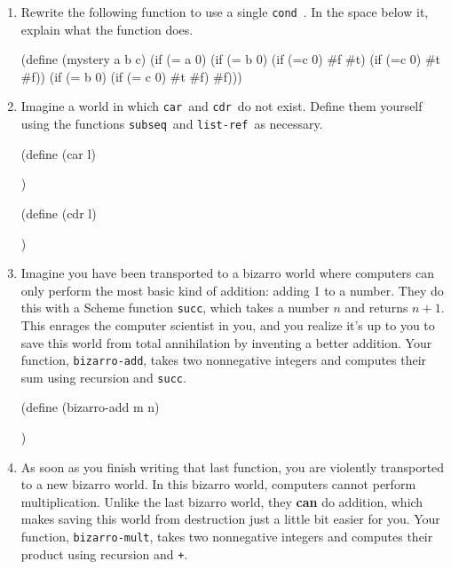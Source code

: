 \documentclass[pdftex,11pt]{article}
\newcommand{\cond}{{\tt cond}\ }
\newcommand{\car}{{\tt car}\ }
\newcommand{\cdr}{{\tt cdr}\ }
\newcommand{\lref}{{\tt list-ref}\ }
\newcommand{\subseq}{{\tt subseq}\ }
\begin{document}
\begin{enumerate}
\item Rewrite the following function to use a single \cond. In the
  space below it, explain what the function does.

\begin{answer}
(define (mystery a b c)
  (if (= a 0)
      (if (= b 0)
          (if (=c 0) #f #t)
          (if (=c 0) #t #f))
      (if (= b 0)
          (if (= c 0) #t #f)
          #f)))
\end{answer}

\vspace{1in}

\item Imagine a world in which \car and \cdr do not exist. Define them
  yourself using the functions \subseq and \lref as necessary.

\begin{minipage}{.47\textwidth}
\begin{answer}
(define (car l)

                                    )
\end{answer}
\end{minipage}
\begin{minipage}{.47\textwidth}
\begin{answer}
(define (cdr l)

                                    )
\end{answer}
\end{minipage}

\item Imagine you have been transported to a bizarro world where
  computers can only perform the most basic kind of addition: adding 1
  to a number. They do this with a Scheme function {\tt succ}, which
  takes a number $n$ and returns $n+1$. This enrages the computer
  scientist in you, and you realize it's up to you to save this world
  from total annihilation by inventing a better addition. Your
  function, {\tt bizarro-add}, takes two nonnegative integers and
  computes their sum using recursion and {\tt succ}.

\begin{answer}
(define (bizarro-add m n)




\hspace{6in})
\end{answer}

\item As soon as you finish writing that last function, you are
  violently transported to a new bizarro world. In this bizarro world,
  computers cannot perform multiplication. Unlike the last bizarro
  world, they {\bf can} do addition, which makes saving this world
  from destruction just a little bit easier for you. Your function,
  {\tt bizarro-mult}, takes two nonnegative integers and computes
  their product using recursion and {\tt +}.


\end{enumerate}
\end{document}
